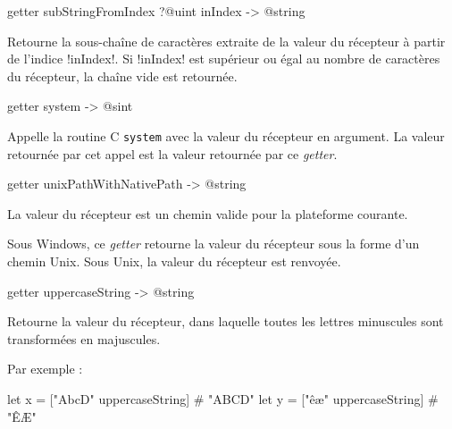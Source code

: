 
\begin{galgasbox}
getter subStringFromIndex ?@uint inIndex -> @string
\end{galgasbox}

Retourne la sous-chaîne de caractères extraite de la valeur du récepteur à partir de l'indice \ggs!inIndex!. Si \ggs!inIndex! est supérieur ou égal au nombre de caractères du récepteur, la chaîne vide est retournée.







\begin{galgasbox}
getter system -> @sint
\end{galgasbox}

Appelle la routine C \texttt{system} avec la valeur du récepteur en argument. La valeur retournée par cet appel est la valeur retournée par ce \emph{getter}.







\begin{galgasbox}
getter unixPathWithNativePath -> @string
\end{galgasbox}

La valeur du récepteur est un chemin valide pour la plateforme courante.

Sous Windows, ce \emph{getter} retourne la valeur du récepteur sous la forme d'un chemin Unix. Sous Unix, la valeur du récepteur est renvoyée.














\begin{galgasbox}
getter uppercaseString -> @string
\end{galgasbox}

Retourne la valeur du récepteur, dans laquelle toutes les lettres minuscules sont transformées en majuscules.

Par exemple :
\begin{galgas}
let x = ["AbcD" uppercaseString] # "ABCD"
let y = ["êæ" uppercaseString] # "ÊÆ"
\end{galgas}














